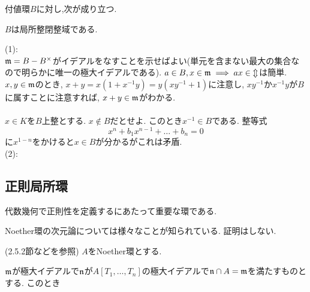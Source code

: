 \begin{prop} 付値環$B$に対し,次が成り立つ.
\ben
\item $B$は局所整閉整域である.
\een
\end{prop}
\prf
(1): \\
$\mathfrak{m} = B-B^{\times}$がイデアルをなすことを示せばよい(単元を含まない最大の集合なので明らかに唯一の極大イデアルである). $a\in B, x\in \mathfrak{m}\implies ax\in \mathcal{m}$は簡単. $x,y\in \mathfrak{m}$のとき, $x+y = x(1+x^{-1}y) = y(xy^{-1} + 1)$に注意し, $xy^{-1}$か$x^{-1}y$が$B$に属すことに注意すれば, $x+y\in\mathfrak{m}$がわかる. \\
 \\
$x\in K$を$B$上整とする. $x\notin B$だとせよ. このとき$x^{-1}\in B$である. 整等式
\[x^n + b_1x^{n-1} + \dots + b_n = 0\]
に$x^{1-n}$をかけると$x\in B$が分かるがこれは矛盾. \\
(2):




\subsection{正則局所環}
代数幾何で正則性を定義するにあたって重要な環である.






Noether環の次元論については様々なことが知られている. 証明はしない.
\begin{prop} (\cite{liu}2.5.2節などを参照)
$A$をNoether環とする.
\ben
\item $\mathfrak{m}$が極大イデアルで$\mathfrak{n}$が$A[T_1,\dots, T_n]$の極大イデアルで$\mathfrak{n}\cap A = \mathfrak{m}$を満たすものとする. このとき
\item {}
\een
\end{prop}

